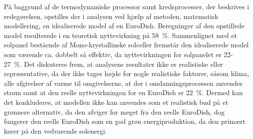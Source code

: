 \documentclass[SRC.tex]{subfiles}
\begin{document}
	På baggrund af de termodynamiske processor samt kredsprocesser, der beskrives i redegørelsen, opstilles der i analysen ved hjælp af metoden, matematisk modellering, en idealiserede model af en EuroDish. Beregninger af den opstillede model resulterede i en teoretisk nyttevirkning på  \SI{58}{\percent}. Sammenlignet med et solpanel bestående af Mono-krystallinske solceller fremstår den idealiserede model som værende ca. dobbelt så effektiv, da nyttevirkningen for solpanelet er 22-\SI{27}{\percent}. Det diskuteres frem, at analysens resultater ikke er realistiske eller repræsentative, da der ikke tages højde for nogle realistiske faktorer, såsom klima, alle afgivelser af varme til omgivelserne, at der i omdanningsprocessen anvendes strøm samt at den reelle nyttevirkningen for en EuroDish er \SI{22}{\percent}. Dermed kan det konkluderes, at modellen ikke kan anvendes som et realistisk bud på et grønnere alternativ, da den afviger for meget fra den reelle EuroDish, dog fungerer den reelle EuroDish som en god grøn energiproduktion, da den primært kører på den vedvarende solenergi. 
\end{document}
